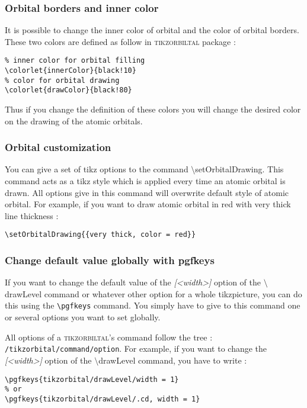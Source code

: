 \documentclass[10pt]{article}
\newcommand*{\cmd}[1]{{\ttfamily\color{blue!50!black}$\setminus$#1}\xspace}
\newcommand*{\opt}[1]{{\ttfamily\itshape\color{green!60!black}[<#1>]}\xspace}
\newcommand{\package}{\textsc{\sffamily\color{blue!50!black}tikzorbiltal}\xspace}
\begin{document}
\subsubsection*{Orbital borders and inner color}

It is possible to change the inner color of orbital and the color of orbital borders. These two colors are defined as follow in \package package :

\begin{lstlisting}
% inner color for orbital filling
\colorlet{innerColor}{black!10}
% color for orbital drawing
\colorlet{drawColor}{black!80}
\end{lstlisting}

Thus if you change the definition of these colors you will change the desired color on the drawing of the atomic orbitals.

\subsubsection*{Orbital customization}

You can give a set of tikz options to the command \cmd{setOrbitalDrawing}. This command acts as a tikz style which is applied every time an atomic orbital is drawn. All options give in this command will overwrite default style of atomic orbital. For example, if you want to draw atomic orbital in red with very thick line thickness :

\begin{lstlisting}
\setOrbitalDrawing{{very thick, color = red}}
\end{lstlisting}

\subsubsection*{Change default value globally with pgfkeys}

If you want to change the default value of the \opt{width} option of the \cmd{drawLevel} command or whatever other option for a whole tikzpicture, you can do this using the \lstinline!\pgfkeys! command. You simply have to give to this command one or several options you want to set globally.

All options of a \package's command follow the tree : \texttt{/tikzorbital/command/option}. For example, if you want to change the \opt{width} option of the \cmd{drawLevel} command, you have to write :
%
\begin{lstlisting}
\pgfkeys{tikzorbital/drawLevel/width = 1}
% or
\pgfkeys{tikzorbital/drawLevel/.cd, width = 1}
\end{lstlisting}
\end{document}
